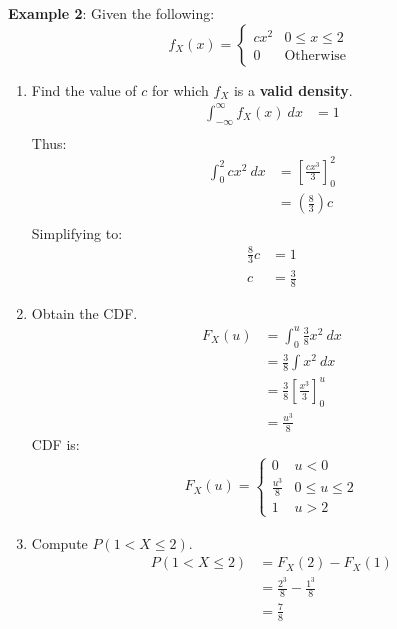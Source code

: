 \documentclass[10pt,a4paper]{article}
\begin{document}
\textbf{Example 2}: Given the following:
$$
    f_X(x) = 
    \begin{cases}
        cx^2 & 0 \leq x \leq 2 \\
        0 & \text{Otherwise}    
    \end{cases}
$$
\begin{enumerate}
    \item Find the value of $c$ for which $f_X$ is a \textbf{valid density}.
        \begin{align*}
            \int_{-\infty}^\infty f_X(x)\: dx &= 1 \\
        \end{align*}
        Thus:
        \begin{align*}
            \int_0^2 cx^2 \: dx &= \left[\frac{cx^3}{3}\right]_0^2 \\
            &= \left(\frac{8}{3}\right)c \\
        \end{align*}
        Simplifying to:
        \begin{align*}
            \frac{8}{3}c &= 1 \\
            c &= \frac{3}{8}
        \end{align*}
    \item Obtain the CDF.
    \begin{align*}
        F_X(u) &= \int_0^u \frac{3}{8}x^2 \: dx \\
        &= \frac{3}{8} \int x^2\: dx \\
        &= \frac{3}{8}\left[\frac{x^3}{3}\right]_0^u \\
        &= \frac{u^3}{8}
    \end{align*}
    CDF is:
    \begin{align*}
        F_X(u) = 
        \begin{cases}
            0 & u<0 \\
            \frac{u^3}{8} & 0\leq u \leq 2 \\
            1 & u>2
        \end{cases}
    \end{align*}
    \item Compute $P(1<X \leq 2)$.
    \begin{align*}
        P(1 < X \leq 2) &= F_X(2) - F_X(1) \\
        &= \frac{2^3}{8}-\frac{1^3}{8} \\
        &= \frac{7}{8}
    \end{align*}
\end{enumerate}
\end{document}

